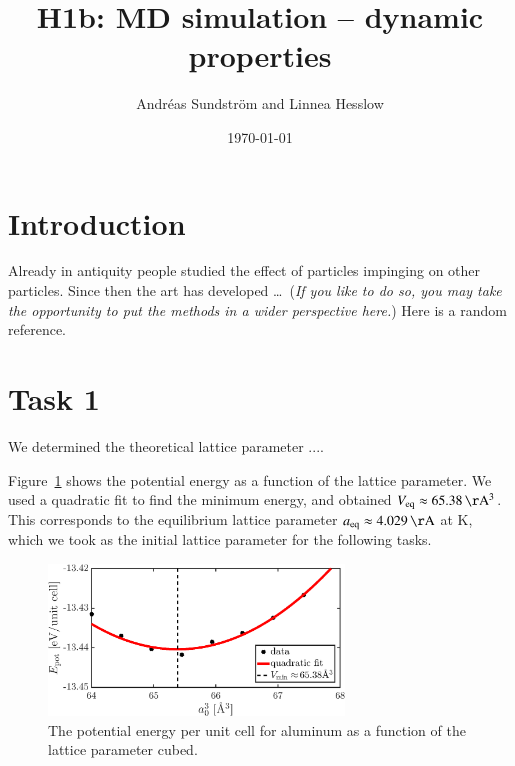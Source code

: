 
\usepackage{units}
\usepackage{physics}

\newcommand{\ee}{\mathrm{e}}
\newcommand{\ii}{\mathrm{i}}

\title{H1b: MD simulation -- dynamic properties}
\author{Andr\'eas Sundstr\"om and Linnea Hesslow}
\date{\today}





\section*{Introduction}

Already in antiquity people studied the effect of particles impinging on other
particles. Since then the art has developed \ldots\
(\emph{If you like to do so, you may take the opportunity to put the  methods
in a wider perspective here.}) Here is a random reference.\cite{lamport94}

\section*{Task 1}
We determined the theoretical lattice parameter ....

Figure~\ref{fig1} shows the potential energy as a function of the lattice parameter. We used a quadratic fit to find the minimum energy, and obtained $V_{\rm eq} \approx \unit[65.38]{\AA^3}$. This corresponds to the equilibrium lattice parameter $a_{\rm eq} \approx \unit[4.029]{\AA}$ at \unit[0]{K}, which we took as the initial lattice parameter for the following tasks.  

\begin{figure}[!ht]
\begin{center}
  \includegraphics[width=0.7\textwidth]{../figures/potential_energy} 
  \caption{The potential energy per unit cell for aluminum as a function of the lattice parameter cubed.}
  \label{fig1}
\end{center}
\end{figure}

